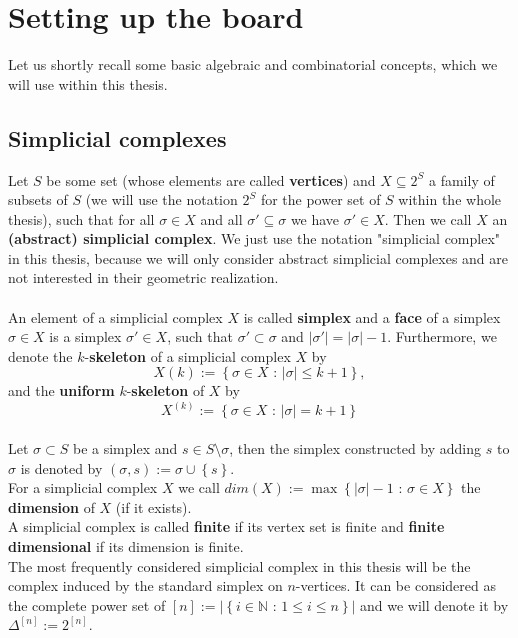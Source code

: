 
\chapter*{Setting up the board}

\label{Chapter1}

Let us shortly recall some basic algebraic and combinatorial concepts, which we will use within this thesis.

\section{Simplicial complexes}

Let \(S\) be some set (whose elements are called \textbf{vertices}) and \(X\subseteq 2^S\) a family of subsets of \(S\) (we will use the notation \(2^S\) for the power set of \(S\) within the whole thesis), such that for all \(\sigma\in X\) and all \(\sigma'\subseteq\sigma\) we have \(\sigma'\in X\). Then we call \(X\) an \textbf{(abstract) simplicial complex}. We just use the notation "simplicial complex" in this thesis, because we will only consider abstract simplicial complexes and are not interested in their geometric realization.\\
\\
An element of a simplicial complex \(X\) is called \textbf{simplex} and a \textbf{face} of a simplex \(\sigma\in X\) is a simplex \(\sigma'\in X\), such that \(\sigma'\subset\sigma\) and \(\left|\sigma'\right|=\left|\sigma\right|-1\). Furthermore, we denote the \(k\)-\textbf{skeleton} of a simplicial complex \(X\) by
\[
X(k):=\left\{\sigma\in X\text{ : }\left|\sigma\right|\leq k+1\right\},
\]
and the \textbf{uniform} \(k\)-\textbf{skeleton} of \(X\) by
\[
X^{(k)}:=\left\{\sigma\in X\text{ : }\left|\sigma\right|=k+1\right\}
\]
\\
Let \(\sigma\subset S\) be a simplex and \(s\in S\setminus\sigma\), then the simplex constructed by adding \(s\) to \(\sigma\) is denoted by \((\sigma,s):=\sigma\cup\left\{s\right\}\).\\
For a simplicial complex \(X\) we call \(dim(X):=\max\left\{\left|\sigma\right|-1\text{ : }\sigma\in X\right\}\) the \textbf{dimension} of \(X\) (if it exists).
\\
A simplicial complex is called \textbf{finite} if its vertex set is finite and \textbf{finite dimensional} if its dimension is finite.\\
The most frequently considered simplicial complex in this thesis will be the complex induced by the standard simplex on \(n\)-vertices. It can be considered as the complete power set of \([n]:=\left|\left\{i\in\mathbb{N}\text{ : }1\leq i\leq n\right\}\right|\) and we will denote it by \(\Delta^{[n]}:=2^{[n]}\).

